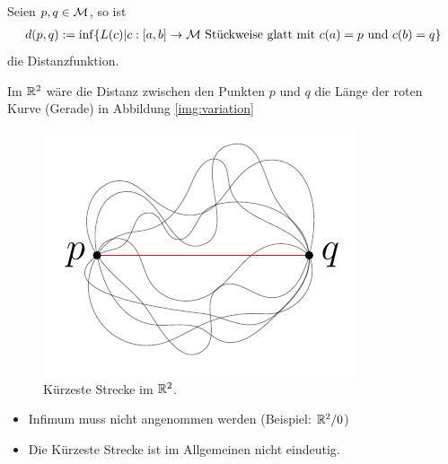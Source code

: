 \begin{defs}[Distanzfunktion]
    Seien $p, q \in \mathcal{M}$, so ist
    \begin{align}
        \label{eq:distanzfuntion}
        d(p,q) := \inf \{ L(c) \vert c : [a, b]\to \mfk \ \text{Stückweise glatt mit} \ c(a) = p \ \text{und} \ c(b) = q \}
    \end{align}
    die Distanzfunktion.
\end{defs}
\begin{bsp}
Im $\mathbb{R}^2$ wäre die Distanz zwischen den Punkten $p$ und $q$ die Länge der roten Kurve (Gerade) in Abbildung \ref{img:variation}
\begin{figure}[H]
\centering
\includegraphics[width=0.35\linewidth]{figures/tikz/variation_straightline.pdf}
\caption{Kürzeste Strecke im $\mathbb{R}^2$.}
\label{img:variation_straightline}
\end{figure} 
\end{bsp}


\begin{bem}\leavevmode
    \begin{itemize}
        \item Infimum muss nicht angenommen werden (Beispiel: $\mathbb{R}^2 / 0 $)
        \item Die Kürzeste Strecke ist im Allgemeinen nicht eindeutig.
     \end{itemize}
\end{bem}
